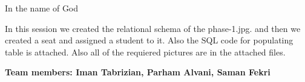 \documentclass[12pt]{article}
\begin{document}
\begin{center} In the name of God \end{center}

In this session we created the relational schema of the phase-1.jpg.
and then we created a seat and assigned a student to it. Also the SQL code for
populating table is attached. Also all of the requiered pictures are in the attached
files.

\small{\textbf{Team members: Iman Tabrizian, Parham Alvani, Saman Fekri}}
\end{document}
